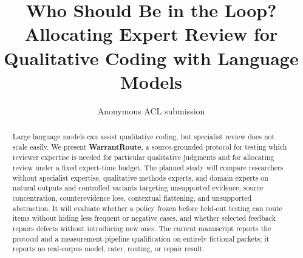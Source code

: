 \documentclass[11pt]{article}
\title{Who Should Be in the Loop?\\
Allocating Expert Review for Qualitative Coding with Language Models}
\author{Anonymous ACL submission}
\newif\ifpredatadraft
\begin{document}
\maketitle

\begin{abstract}
Large language models can assist qualitative coding, but specialist review does not scale easily. We present \textbf{WarrantRoute}, a source-grounded protocol for testing which reviewer expertise is needed for particular qualitative judgments and for allocating review under a fixed expert-time budget. The planned study will compare researchers without specialist expertise, qualitative methods experts, and domain experts on natural outputs and controlled variants targeting unsupported evidence, source concentration, counterevidence loss, contextual flattening, and unsupported abstraction. It will evaluate whether a policy frozen before held-out testing can route items without hiding less frequent or negative cases, and whether selected feedback repairs defects without introducing new ones. The current manuscript reports the protocol and a measurement-pipeline qualification on entirely fictional packets; it reports no real-corpus model, rater, routing, or repair result.
\end{abstract}

\ifpredatadraft
\begin{center}
\small\itshape Manuscript skeleton: gray fields and blank table cells must be replaced from the frozen analysis export.
\end{center}
\fi



\clearpage


\appendix

\end{document}
